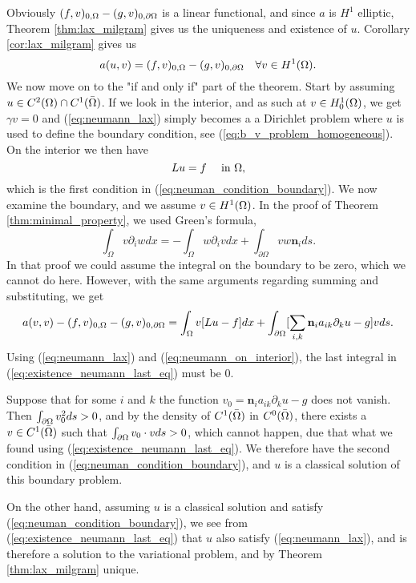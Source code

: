 \begin{bev}
   Obviously $ (f,v)_{0,\Omega} - (g,v)_{0,\partial\Omega}$ is a linear functional, 
   and since $a$ is $H^1$ elliptic, Theorem \ref{thm:lax_milgram} gives us the 
   uniqueness and existence of $u$.
   Corollary \ref{cor:lax_milgram} gives us
   \begin{equation}
      a(u,v) = (f,v)_{0,\Omega} - (g,v)_{0,\partial\Omega} \quad \forall v \in H^1(\Omega). \label{eq:neumann_lax}
   \end{equation}
   We now move on to the "if and only if" part of the theorem. Start by 
   assuming $u \in C^2(\Omega)\cap C^1(\bar{\Omega})$.
   If we look in the interior, and as such at $v \in H^1_0(\Omega)$, we get $\gamma v=0$ 
   and (\ref{eq:neumann_lax}) simply becomes a a Dirichlet problem where 
   $u$ is used to define the boundary condition, see (\ref{eq:b_v_problem_homogeneous}).
   On the interior we then have 
   \begin{equation}
    Lu = f \quad \text{ in }\Omega, \label{eq:neumann_on_interior}
   \end{equation} 
   which is the first condition in (\ref{eq:neuman_condition_boundary}).
   We now examine the boundary, and we assume $v\in H^1(\Omega)$.
   In the proof of Theorem \ref{thm:minimal_property}, we used Green's formula,
    \begin{equation} %
        \int_\Omega v\partial_i w dx = -\int_\Omega w \partial_i v dx + \int_{\partial \Omega} v w \mathbf{n}_i ds.
    \end{equation}
   In that proof we could assume the integral on the boundary to be zero, which 
   we cannot do here. However, with the same arguments regarding summing and substituting, 
   we get
   \begin{equation}
      a(v,v) - (f,v)_{0,\Omega} - (g,v)_{0,\partial\Omega} = 
      \int_\Omega v[Lu - f] dx + \int_{\partial \Omega}
     [ \sum_{i,k}  \mathbf{n}_i a_{ik} \partial_k u-g]v ds.
     \label{eq:existence_neumann_last_eq}
   \end{equation}
   Using (\ref{eq:neumann_lax}) and (\ref{eq:neumann_on_interior}),
   the last integral in (\ref{eq:existence_neumann_last_eq}) must be $0$.

   Suppose that for some $i$ and $k$ the function $v_0 = \mathbf{n}_i a_{ik} \partial_k u -g$ does 
   not vanish. Then $\int_{\partial\Omega}v_0^2ds>0$, and by the density of 
   $C^1(\bar{\Omega})$ in $C^0(\bar{\Omega})$, there exists a $v\in C^1(\bar{\Omega})$
   such that  $\int_{\partial\Omega}v_0\cdot vds>0$, which cannot happen, due that 
   what we found using (\ref{eq:existence_neumann_last_eq}). 
   We therefore have the second condition in (\ref{eq:neuman_condition_boundary}),
   and $u$ is a classical solution of this boundary problem.

   On the other hand, assuming $u$ is a classical solution and satisfy (\ref{eq:neuman_condition_boundary}),
   we see from (\ref{eq:existence_neumann_last_eq}) that $u$ also satisfy 
   (\ref{eq:neumann_lax}), and is therefore a solution to the variational 
   problem, and by Theorem \ref{thm:lax_milgram} unique.
\end{bev}